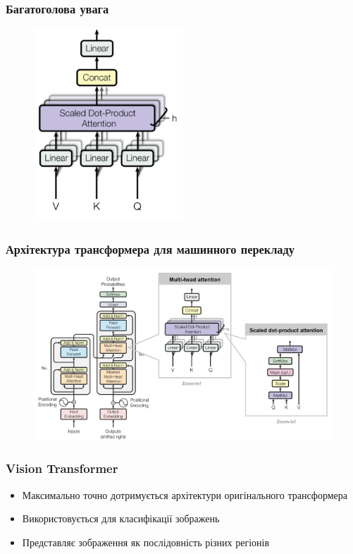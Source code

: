 \documentclass{beamer}
\begin{document}
\begin{frame}
    \frametitle{Багатоголова увага}
    \begin{figure}[H]
        \centering
        \includegraphics[width=0.5\textwidth]{multi-head-attention.png}
    \end{figure}

\end{frame}

\begin{frame}
    \frametitle{Архітектура трансформера для машинного перекладу}
    \begin{figure}[H]
        \centering
        \includegraphics[width=1\textwidth]{transformer.png}
    \end{figure}
    
\end{frame}

\begin{frame}
    \frametitle{Vision Transformer}
    \begin{itemize}
        \item Максимально точно дотримується архітектури
        оригінального трансформера
        \item Використовується для класифікації зображень
        \item Представляє зображення як послідовність різних регіонів
    \end{itemize}
    
\end{frame}
\end{document}
